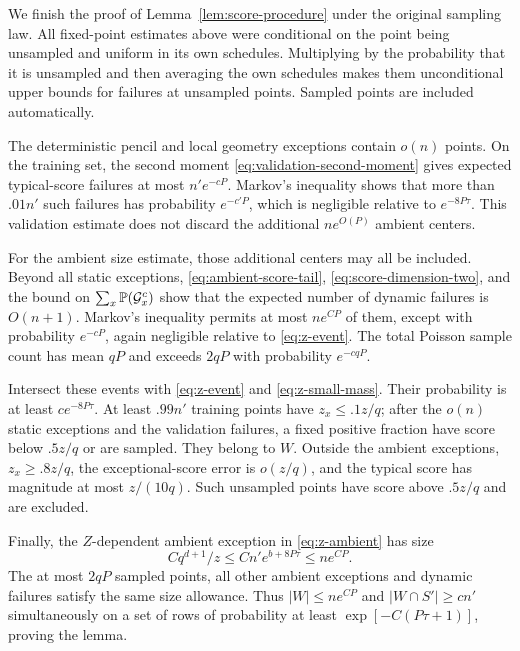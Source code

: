 We finish the proof of Lemma~\ref{lem:score-procedure} under the original
sampling law.  All fixed-point estimates above were conditional on the
point being unsampled and uniform in its own schedules.  Multiplying by
the probability that it is unsampled and then averaging the own
schedules makes them unconditional upper bounds for failures at
unsampled points.  Sampled points are included automatically.

The deterministic pencil and local geometry exceptions contain
\(o(n)\) points.  On the training set, the second moment
\eqref{eq:validation-second-moment} gives expected typical-score failures
at most \(n'e^{-cP}\).  Markov's inequality shows that more than \(.01n'\)
such failures has probability \(e^{-c'P}\), which is negligible relative
to \(e^{-8P\tau}\).  This validation estimate does not discard the
additional \(ne^{O(P)}\) ambient centers.

For the ambient size estimate, those additional centers may all be
included.  Beyond all static exceptions, \eqref{eq:ambient-score-tail},
\eqref{eq:score-dimension-two}, and the bound on
\(\sum_x\mathbb P(\mathcal G_x^c)\) show that the expected number of dynamic
failures is \(O(n+1)\).  Markov's inequality permits at most \(ne^{CP}\)
of them, except with probability \(e^{-cP}\), again negligible relative
to \eqref{eq:z-event}.  The total Poisson sample count has mean \(qP\)
and exceeds \(2qP\) with probability \(e^{-cqP}\).

Intersect these events with \eqref{eq:z-event} and
\eqref{eq:z-small-mass}.  Their probability is at least
\(ce^{-8P\tau}\).  At least \(.99n'\) training points have
\(z_x\le .1z/q\); after the \(o(n)\) static exceptions and the validation
failures, a fixed positive fraction have score below \(.5z/q\) or are
sampled.  They belong to \(W\).  Outside the ambient exceptions,
\(z_x\ge .8z/q\), the exceptional-score error is \(o(z/q)\), and the
typical score has magnitude at most \(z/(10q)\).  Such unsampled points
have score above \(.5z/q\) and are excluded.

Finally, the \(Z\)-dependent ambient exception in
\eqref{eq:z-ambient} has size
\[
 Cq^{d+1}/z\le Cn'e^{b+8P\tau}\le ne^{CP}.
\]
The at most \(2qP\) sampled points, all other ambient exceptions and
dynamic failures satisfy the same size allowance.  Thus
\(|W|\le ne^{CP}\) and \(|W\cap S'|\ge cn'\) simultaneously on a set of
rows of probability at least \(\exp[-C(P\tau+1)]\), proving the lemma.
